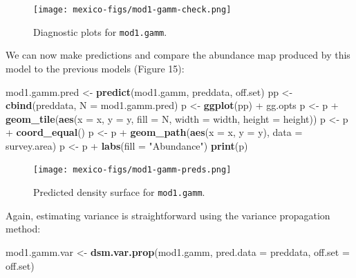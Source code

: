 \documentclass[]{amsart}
\newenvironment{Shaded}{}{}
\newcommand{\KeywordTok}[1]{\textcolor[rgb]{0.00,0.44,0.13}{\textbf{{#1}}}}
\newcommand{\DataTypeTok}[1]{\textcolor[rgb]{0.56,0.13,0.00}{{#1}}}
\newcommand{\StringTok}[1]{\textcolor[rgb]{0.25,0.44,0.63}{{#1}}}
\newcommand{\NormalTok}[1]{{#1}}
\begin{document}
\begin{figure}[htbp]
\centering
\texttt{[image: mexico-figs/mod1-gamm-check.png]}
\caption{Diagnostic plots for \texttt{mod1.gamm}.}
\end{figure}

We can now make predictions and compare the abundance map produced by
this model to the previous models (Figure 15):

\begin{Shaded}
\begin{Highlighting}[]
\NormalTok{mod1.gamm.pred <-}\StringTok{ }\KeywordTok{predict}\NormalTok{(mod1.gamm, preddata, off.set)}
\NormalTok{pp <-}\StringTok{ }\KeywordTok{cbind}\NormalTok{(preddata, }\DataTypeTok{N =} \NormalTok{mod1.gamm.pred)}
\NormalTok{p <-}\StringTok{ }\KeywordTok{ggplot}\NormalTok{(pp) +}\StringTok{ }\NormalTok{gg.opts}
\NormalTok{p <-}\StringTok{ }\NormalTok{p +}\StringTok{ }\KeywordTok{geom_tile}\NormalTok{(}\KeywordTok{aes}\NormalTok{(}\DataTypeTok{x =} \NormalTok{x, }\DataTypeTok{y =} \NormalTok{y, }\DataTypeTok{fill =} \NormalTok{N, }\DataTypeTok{width =} \NormalTok{width, }\DataTypeTok{height =} \NormalTok{height))}
\NormalTok{p <-}\StringTok{ }\NormalTok{p +}\StringTok{ }\KeywordTok{coord_equal}\NormalTok{()}
\NormalTok{p <-}\StringTok{ }\NormalTok{p +}\StringTok{ }\KeywordTok{geom_path}\NormalTok{(}\KeywordTok{aes}\NormalTok{(}\DataTypeTok{x =} \NormalTok{x, }\DataTypeTok{y =} \NormalTok{y), }\DataTypeTok{data =} \NormalTok{survey.area)}
\NormalTok{p <-}\StringTok{ }\NormalTok{p +}\StringTok{ }\KeywordTok{labs}\NormalTok{(}\DataTypeTok{fill =} \StringTok{"Abundance"}\NormalTok{)}
\KeywordTok{print}\NormalTok{(p)}
\end{Highlighting}
\end{Shaded}

\begin{figure}[htbp]
\centering
\texttt{[image: mexico-figs/mod1-gamm-preds.png]}
\caption{Predicted density surface for \texttt{mod1.gamm}.}
\end{figure}

Again, estimating variance is straightforward using the variance
propagation method:

\begin{Shaded}
\begin{Highlighting}[]
\NormalTok{mod1.gamm.var <-}\StringTok{ }\KeywordTok{dsm.var.prop}\NormalTok{(mod1.gamm, }\DataTypeTok{pred.data =} \NormalTok{preddata, }\DataTypeTok{off.set =} \NormalTok{off.set)}
\end{Highlighting}
\end{Shaded}
\end{document}
